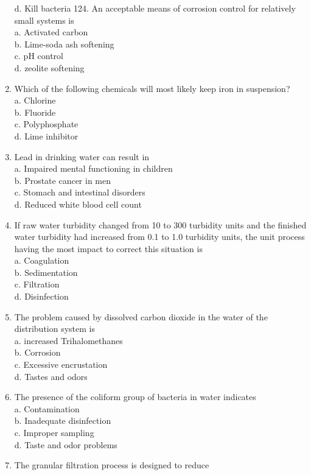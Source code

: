 \begin{enumerate}
d. Kill bacteria 124. An acceptable means of corrosion control for relatively small systems is\\
a. Activated carbon\\
b. Lime-soda ash softening\\
c. $\mathrm{pH}$ control\\
d. zeolite softening\\
\item Which of the following chemicals will most likely keep iron in suspension?\\
a. Chlorine\\
b. Fluoride\\
c. Polyphosphate\\
d. Lime inhibitor\\
\item Lead in drinking water can result in\\
a. Impaired mental functioning in children\\
b. Prostate cancer in men\\
c. Stomach and intestinal disorders\\
d. Reduced white blood cell count\\
\item If raw water turbidity changed from 10 to 300 turbidity units and the finished water turbidity had increased from 0.1 to 1.0 turbidity units, the unit process having the most impact to correct this situation is\\
a. Coagulation\\
b. Sedimentation\\
c. Filtration\\
d. Disinfection\\
\item The problem caused by dissolved carbon dioxide in the water of the distribution system is\\
a. increased Trihalomethanes\\
b. Corrosion\\
c. Excessive encrustation\\
d. Tastes and odors\\
\item The presence of the coliform group of bacteria in water indicates\\
a. Contamination\\
b. Inadequate disinfection\\
c. Improper sampling\\
d. Taste and odor problems\\
\item The granular filtration process is designed to reduce\\

\end{enumerate}
